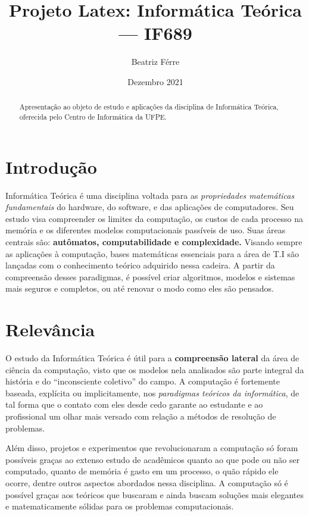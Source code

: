 \documentclass{article}
\begin{document}
\title{Projeto Latex: Informática Teórica — IF689}
\author{Beatriz Férre}
\date{Dezembro 2021}
\maketitle

\begin{abstract}
Apresentação ao objeto de estudo e aplicações da disciplina de Informática Teórica, oferecida pelo Centro de Informática da UFPE.
\end{abstract}
\section{Introdução}


Informática Teórica é uma disciplina voltada para as \textit{propriedades matemáticas fundamentais} do hardware, do software, e das aplicações de computadores. Seu estudo visa compreender os limites da computação, os custos de cada processo na memória e os diferentes modelos computacionais passíveis de uso. Suas áreas centrais são: \textbf{autômatos, computabilidade e complexidade.} Visando sempre as aplicações à computação, bases matemáticas essenciais para a área de T.I são lançadas com o conhecimento teórico adquirido nessa cadeira. A partir da compreensão desses paradigmas, é possível criar algoritmos, modelos e sistemas mais seguros e completos, ou até renovar o modo como eles são pensados.
\cite{introduction}

\section{Relevância}

O estudo da Informática Teórica é útil para a \textbf{compreensão lateral} da área de ciência da computação, visto que os modelos nela analisados são parte integral da história e do “inconsciente coletivo” do campo. A computação é fortemente baseada, explícita ou implicitamente, nos \textit{paradigmas teóricos da informática}, de tal forma que o contato com eles desde cedo garante ao estudante e ao profissional um olhar mais versado com relação a métodos de resolução de problemas.

Além disso, projetos e experimentos que revolucionaram a computação só foram possíveis graças ao extenso estudo de acadêmicos quanto ao que pode ou não ser computado, quanto de memória é gasto em um processo, o quão rápido ele ocorre, dentre outros aspectos abordados nessa disciplina. A computação só é possível graças aos teóricos que buscaram e ainda buscam soluções mais elegantes e matematicamente sólidas para os problemas computacionais.
\cite{elements}
 
\end{document}

